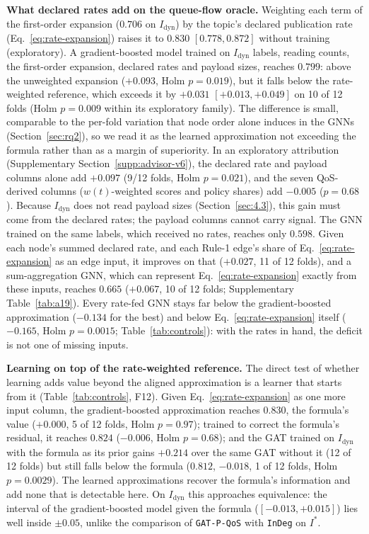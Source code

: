 \noindent\textbf{What declared rates add on the queue-flow oracle.} Weighting each term of the first-order expansion ($0.706$ on $I_{\text{dyn}}$) by the topic's declared publication rate (Eq.~\eqref{eq:rate-expansion}) raises it to $0.830$ $[0.778, 0.872]$ without training (exploratory). A gradient-boosted model trained on $I_{\text{dyn}}$ labels, reading counts, the first-order expansion, declared rates and payload sizes, reaches $0.799$: above the unweighted expansion ($+0.093$, Holm $p = 0.019$), but it falls below the rate-weighted reference, which exceeds it by $+0.031$ $[+0.013, +0.049]$ on 10 of 12 folds (Holm $p = 0.009$ within its exploratory family). The difference is small, comparable to the per-fold variation that node order alone induces in the GNNs (Section~\ref{sec:rq2}), so we read it as the learned approximation not exceeding the formula rather than as a margin of superiority. In an exploratory attribution (Supplementary Section~\ref{supp:advisor-v6}), the declared rate and payload columns alone add $+0.097$ (9/12 folds, Holm $p = 0.021$), and the seven QoS-derived columns ($w(t)$-weighted scores and policy shares) add $-0.005$ ($p = 0.68$). Because $I_{\text{dyn}}$ does not read payload sizes (Section~\ref{sec:4.3}), this gain must come from the declared rates; the payload columns cannot carry signal. The GNN trained on the same labels, which received no rates, reaches only $0.598$. Given each node's summed declared rate, and each Rule-1 edge's share of Eq.~\eqref{eq:rate-expansion} as an edge input, it improves on that ($+0.027$, 11 of 12 folds), and a sum-aggregation GNN, which can represent Eq.~\eqref{eq:rate-expansion} exactly from these inputs, reaches $0.665$ ($+0.067$, 10 of 12 folds; Supplementary Table~\ref{tab:a19}). Every rate-fed GNN stays far below the gradient-boosted approximation ($-0.134$ for the best) and below Eq.~\eqref{eq:rate-expansion} itself ($-0.165$, Holm $p = 0.0015$; Table~\ref{tab:controls}): with the rates in hand, the deficit is not one of missing inputs.

\noindent\textbf{Learning on top of the rate-weighted reference.} The direct test of whether learning adds value beyond the aligned approximation is a learner that starts from it (Table~\ref{tab:controls}, F12). Given Eq.~\eqref{eq:rate-expansion} as one more input column, the gradient-boosted approximation reaches $0.830$, the formula's value ($+0.000$, 5 of 12 folds, Holm $p = 0.97$); trained to correct the formula's residual, it reaches $0.824$ ($-0.006$, Holm $p = 0.68$); and the GAT trained on $I_{\text{dyn}}$ with the formula as its prior gains $+0.214$ over the same GAT without it (12 of 12 folds) but still falls below the formula ($0.812$, $-0.018$, 1 of 12 folds, Holm $p = 0.0029$). The learned approximations recover the formula's information and add none that is detectable here. On $I_{\text{dyn}}$ this approaches equivalence: the interval of the gradient-boosted model given the formula ($[-0.013, +0.015]$) lies well inside $\pm 0.05$, unlike the comparison of \texttt{GAT-P-QoS} with \texttt{InDeg} on $I^*$.

